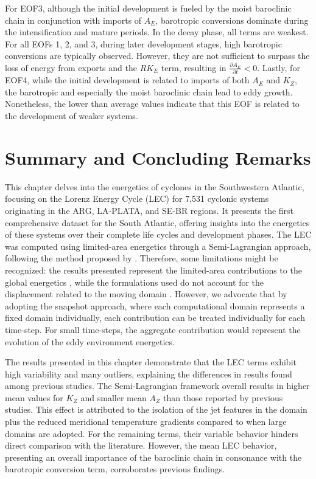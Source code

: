 For EOF3, although the initial development is fueled by the moist baroclinic chain in conjunction with imports of $A_E$, barotropic conversions dominate during the intensification and mature periods. In the decay phase, all terms are weakest. For all EOFs 1, 2, and 3, during later development stages, high barotropic conversions are typically observed. However, they are not sufficient to surpass the loss of energy from exports and the $RK_E$ term, resulting in $\frac{\partial A_E}{\partial t} < 0$. Lastly, for EOF4, while the initial development is related to imports of both $A_E$ and $K_Z$, the barotropic and especially the moist baroclinic chain lead to eddy growth. Nonetheless, the lower than average values indicate that this EOF is related to the development of weaker systems.

\section{Summary and Concluding Remarks}

This chapter delves into the energetics of cyclones in the Southwestern Atlantic, focusing on the Lorenz Energy Cycle (LEC) for 7,531 cyclonic systems originating in the ARG, LA-PLATA, and SE-BR regions. It presents the first comprehensive dataset for the South Atlantic, offering insights into the energetics of these systems over their complete life cycles and development phases. The LEC was computed using limited-area energetics through a Semi-Lagrangian approach, following the method proposed by \citet{michaelides1999quasi}. Therefore, some limitations might be recognized: the results presented represent the limited-area contributions to the global energetics \citep{smith1969contribution}, while the formulations used do not account for the displacement related to the moving domain \citep{michaelides1999quasi}. However, we advocate that by adopting the snapshot approach, where each computational domain represents a fixed domain individually, each contribution can be treated individually for each time-step. For small time-steps, the aggregate contribution would represent the evolution of the eddy environment energetics.

The results presented in this chapter demonstrate that the LEC terms exhibit high variability and many outliers, explaining the differences in results found among previous studies. The Semi-Lagrangian framework overall results in higher mean values for $K_Z$ and smaller mean $A_Z$ than those reported by previous studies. This effect is attributed to the isolation of the jet features in the domain plus the reduced meridional temperature gradients compared to when large domains are adopted. For the remaining terms, their variable behavior hinders direct comparison with the literature. However, the mean LEC behavior, presenting an overall importance of the baroclinic chain in consonance with the barotropic conversion term, corroborates previous findings.

